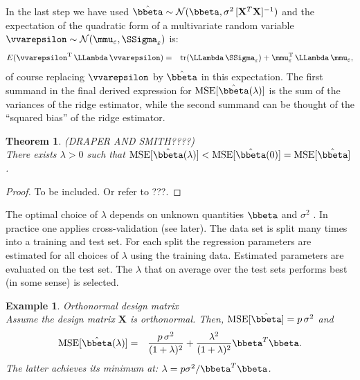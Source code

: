 \documentclass[a4paper]{article}
\theoremstyle{myexamplestyle}
\newtheorem{example}{Example}
\newtheorem{ther}{Theorem}
\begin{document}
In the last step we have used $\hat{\bbeta} \sim  \mathcal{N}( \bbeta, \sigma^2 \, [\mathbf{X}^T \mathbf{X}]^{-1} )$ and the expectation of the quadratic form of a multivariate random variable $\vvarepsilon \sim \mathcal{N}(\mmu_{\varepsilon}, \SSigma_{\varepsilon})$ is:
\begin{eqnarray*}
E ( \vvarepsilon^{\mathrm{T}} \, \LLambda \, \vvarepsilon) & = & \mbox{tr} ( \LLambda \, \SSigma_{\varepsilon}) + \mmu_{\varepsilon}^{\mathrm{T}} \, \LLambda \, \mmu_{\varepsilon},
\end{eqnarray*}
of course replacing $\vvarepsilon$ by $\hat{\bbeta}$ in this expectation. The first summand in the final derived expression for $\mbox{MSE}[\hat{\bbeta}(\lambda)]$ is the sum of the variances of the ridge estimator, while the second summand can be thought of the ``squared bias'' of the ridge estimator.



\begin{ther} (DRAPER AND SMITH????)
\\
There exists $\lambda > 0$ such that $\mbox{MSE}[\hat{\bbeta}(\lambda)] < \mbox{MSE}[\hat{\bbeta}(0)] = \mbox{MSE}[\hat{\bbeta}]$.
\end{ther}
\begin{proof}
To be included. Or refer to ???.
\end{proof}

The optimal choice of $λ$ depends on unknown quantities $\bbeta$ and $\sigma^2$ . In practice one applies cross-validation (see later). The data set is split many times into a training and test set. For each split the regression parameters are estimated for all choices of $\lambda$ using the training data. Estimated parameters are evaluated on the test set. The $\lambda$ that on average over the test sets performs best (in some sense) is selected.


\begin{example} \textit{Orthonormal design matrix}
\\
Assume the design matrix $\mathbf{X}$ is orthonormal. Then, 
$\mbox{MSE}[ \hat{\bbeta} ]  =  p \, \sigma^2$ and 
\begin{eqnarray*}
\mbox{MSE}[ \hat{\bbeta}(\lambda) ] & = & \frac{p \, \sigma^2}{ (1+ \lambda)^{2}} +  \frac{\lambda^2}{ (1+ \lambda)^{2}} \bbeta^T  \bbeta.
\end{eqnarray*}
The latter achieves its minimum at: $\lambda = p \sigma^2 / \bbeta^T  \bbeta$.
\end{example}
\end{document}
